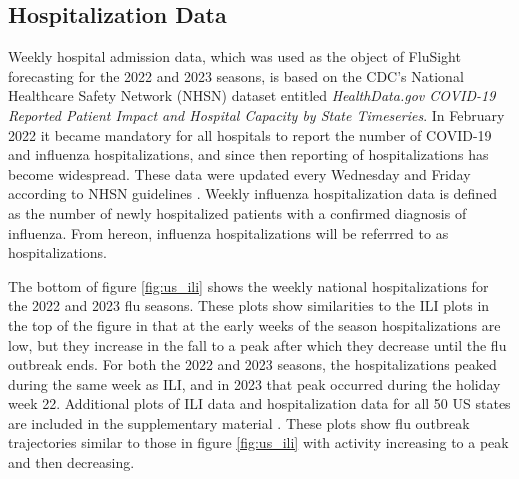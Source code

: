 \subsection{Hospitalization Data}

Weekly hospital admission data, which was used as the object of FluSight 
forecasting for the 
2022 and 2023 seasons, is based on the CDC's National Healthcare Safety 
Network (NHSN) dataset entitled \textit{HealthData.gov COVID-19 Reported 
Patient Impact and Hospital Capacity by State Timeseries}. 
In February 2022 it became mandatory for 
all hospitals to report the number of COVID-19 and influenza hospitalizations, 
and since then reporting of hospitalizations has become widespread. These data 
were updated every Wednesday and Friday according to NHSN guidelines 
\cite[]{healthdata2024covidts}. Weekly influenza hospitalization data is
defined as the number of newly hospitalized patients with a confirmed diagnosis 
of influenza. From hereon, influenza hospitalizations
will be referrred to as hospitalizations.

The bottom of figure \ref{fig:us_ili} shows the weekly national 
hospitalizations for the 2022 and 2023 flu seasons. These plots show 
similarities to the ILI plots in the top of the figure in that at the early 
weeks of the season hospitalizations are low, but they increase in the fall 
to a peak after which they decrease until the flu outbreak ends. For both the 
2022 and 2023 seasons, the hospitalizations peaked during the same week as 
ILI, and in 2023 that peak occurred during the holiday week 22. Additional 
plots of ILI data and hospitalization
data for all 50 US states are included in the supplementary material 
\cite[]{wadsworth2024bas}. These plots show flu outbreak trajectories similar 
to 
those in figure \ref{fig:us_ili} with activity increasing
to a peak and then decreasing.    































